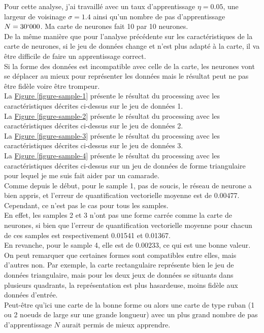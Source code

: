 \documentclass{article}
\begin{document}
Pour cette analyse, j'ai travaillé avec un taux d'apprentissage $\eta = 0.05$, une largeur de voisinage $\sigma = 1.4$ ainsi qu'un nombre de pas d'apprentissage $N=30`000$. Ma carte de neurones fait 10 par 10 neurones.\\
De la même manière que pour l'analyse précédente sur les caractéristiques de la carte de neurones, si le jeu de données change et n'est plus adapté à la carte, il va être difficile de faire un apprentissage correct.\\
Si la forme des données est incompatible avec celle de la carte, les neurones vont se déplacer au mieux pour représenter les données mais le résultat peut ne pas être fidèle voire être trompeur.\\
La \hyperlink{figure-sample-1}{Figure \ref{figure-sample-1}} présente le résultat du processing avec les caractéristiques décrites ci-dessus sur le jeu de données 1.\\
La \hyperlink{figure-sample-2}{Figure \ref{figure-sample-2}} présente le résultat du processing avec les caractéristiques décrites ci-dessus sur le jeu de données 2.\\
La \hyperlink{figure-sample-3}{Figure \ref{figure-sample-3}} présente le résultat du processing avec les caractéristiques décrites ci-dessus sur le jeu de données 3.\\
La \hyperlink{figure-sample-4}{Figure \ref{figure-sample-4}} présente le résultat du processing avec les caractéristiques décrites ci-dessus sur un jeu de données de forme triangulaire pour lequel je me suis fait aider par un camarade.\\
Comme depuis le début, pour le sample 1, pas de soucis, le réseau de neurone a bien appris, et l'erreur de quantification vectorielle moyenne est de 0.00477. Cependant, ce n'est pas le cas pour tous les samples.\\
En effet, les samples 2 et 3 n'ont pas une forme carrée comme la carte de neurones, si bien que l'erreur de quantification vectorielle moyenne pour chacun de ces samples est respectivement 0.01541 et 0.01367.\\
En revanche, pour le sample 4, elle est de 0.00233, ce qui est une bonne valeur. On peut remarquer que certaines formes sont compatibles entre elles, mais d'autres non. Par exemple, la carte rectangulaire représente bien le jeu de données triangulaire, mais pour les deux jeux de données se situants dans plusieurs quadrants, la représentation est plus hasardeuse, moins fidèle aux données d'entrée.\\
Peut-être qu'ici une carte de la bonne forme ou alors une carte de type ruban (1 ou 2 noeuds de large sur une grande longueur) avec un plus grand nombre de pas d'apprentissage $N$ aurait permis de mieux apprendre.
\end{document}
